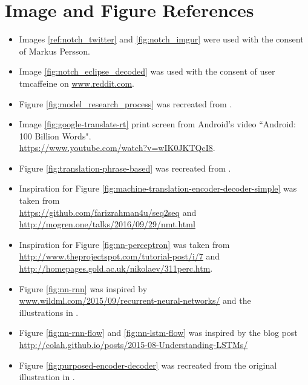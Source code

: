 
\chapter{Image and Figure References}


\begin{itemize}
    \item Images \ref{ref:notch_twitter} and \ref{fig:notch_imgur} were used with the consent of Markus Persson.
    \item Image \ref{fig:notch_eclipse_decoded} was used with the consent of user tmcaffeine on \url{www.reddit.com}.
    \item Figure \ref{fig:model_research_process} was recreated from \citep{oates2005researching}.
    \item Image \ref{fig:google-translate-rt} print screen from Android's video ``Android: 100 Billion Words".\\ \url{https://www.youtube.com/watch?v=wIK0JKTQcI8}.
    \item Figure \ref{fig:translation-phrase-based} was recreated from \citep{koehn2010statistical}.
    \item Inspiration for Figure \ref{fig:machine-translation-encoder-decoder-simple} was taken from \\ \url{https://github.com/farizrahman4u/seq2seq} and\\\url{http://mogren.one/talks/2016/09/29/nmt.html}
    \item Inspiration for Figure \ref{fig:nn-perceptron} was taken from\\\url{http://www.theprojectspot.com/tutorial-post/i/7} and \\ \url{http://homepages.gold.ac.uk/nikolaev/311perc.htm}.
    \item Figure \ref{fig:nn-rnn} was inspired by \\ \url{www.wildml.com/2015/09/recurrent-neural-networks/} and the\\ illustrations in \citep{goodfellow2016deeplearning}.
    \item Figure \ref{fig:nn-rnn-flow} and \ref{fig:nn-lstm-flow} was inspired by the blog post \\ \url{http://colah.github.io/posts/2015-08-Understanding-LSTMs/}
    \item Figure \ref{fig:purposed-encoder-decoder} was recreated from the original illustration in  \citep{cho2014learning}.
\end{itemize}